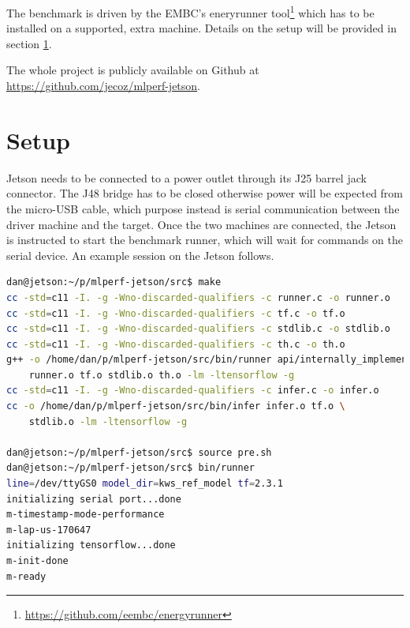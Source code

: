 \documentclass{article}
\begin{document}
The benchmark is driven by the EMBC's eneryrunner tool\footnote{\url{https://github.com/eembc/energyrunner}} which has to be installed on a supported, extra machine. Details on the setup will be provided in section \ref{stp}.

The whole project is publicly available on Github at \url{https://github.com/jecoz/mlperf-jetson}.

\section{Setup}\label{stp}
Jetson needs to be connected to a power outlet through its J25 barrel jack connector. The J48 bridge has to be closed otherwise power will be expected from the micro-USB cable, which purpose instead is serial communication between the driver machine and the target. Once the two machines are connected, the Jetson is instructed to start the benchmark runner, which will wait for commands on the serial device. An example session on the Jetson follows.
\begin{lstlisting}[language=bash]
dan@jetson:~/p/mlperf-jetson/src$ make
cc -std=c11 -I. -g -Wno-discarded-qualifiers -c runner.c -o runner.o
cc -std=c11 -I. -g -Wno-discarded-qualifiers -c tf.c -o tf.o
cc -std=c11 -I. -g -Wno-discarded-qualifiers -c stdlib.c -o stdlib.o
cc -std=c11 -I. -g -Wno-discarded-qualifiers -c th.c -o th.o
g++ -o /home/dan/p/mlperf-jetson/src/bin/runner api/internally_implemented.o \
	runner.o tf.o stdlib.o th.o -lm -ltensorflow -g
cc -std=c11 -I. -g -Wno-discarded-qualifiers -c infer.c -o infer.o
cc -o /home/dan/p/mlperf-jetson/src/bin/infer infer.o tf.o \     
    stdlib.o -lm -ltensorflow -g

dan@jetson:~/p/mlperf-jetson/src$ source pre.sh
dan@jetson:~/p/mlperf-jetson/src$ bin/runner
line=/dev/ttyGS0 model_dir=kws_ref_model tf=2.3.1
initializing serial port...done
m-timestamp-mode-performance
m-lap-us-170647
initializing tensorflow...done
m-init-done
m-ready
\end{lstlisting}
\end{document}
